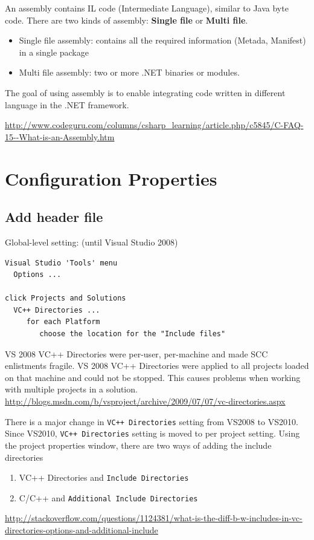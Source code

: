 An assembly contains IL code (Intermediate Language), similar to Java byte code.
There are two kinds of assembly: {\bf Single file} or {\bf Multi file}.
\begin{itemize}
  \item Single file assembly: contains all the required information (Metada,
  Manifest) in a single package
  \item Multi file assembly: two or more .NET binaries or modules.
\end{itemize}

The goal of using assembly is to enable integrating code written in different
language in the .NET framework.

\url{http://www.codeguru.com/columns/csharp_learning/article.php/c5845/C-FAQ-15--What-is-an-Assembly.htm}



\section{Configuration Properties}
\label{sec:VS_Configuration_Properties}

\subsection{Add header file}

Global-level setting: (until Visual Studio 2008)
\begin{verbatim}
Visual Studio 'Tools' menu
  Options ...
     
click Projects and Solutions
  VC++ Directories ...
     for each Platform
        choose the location for the "Include files"
\end{verbatim}
VS 2008 VC++ Directories were per-user, per-machine and made SCC enlistments
fragile.  VS 2008 VC++ Directories were applied to all projects loaded on that
machine and could not be stopped. This causes problems when working with multiple projects in a solution.
\url{http://blogs.msdn.com/b/vsproject/archive/2009/07/07/vc-directories.aspx}

There is a major change in \verb!VC++ Directories! setting from VS2008 to
VS2010.  Since VS2010, \verb!VC++ Directories! setting is moved to per project
setting.
Using the project properties window, there are two ways of adding the include
directories
\begin{enumerate}
  \item VC++ Directories and \verb!Include Directories!
  

  
  \item C/C++ and \verb!Additional Include Directories!
  
\end{enumerate}
\url{http://stackoverflow.com/questions/1124381/what-is-the-diff-b-w-includes-in-vc-directories-options-and-additional-include}

